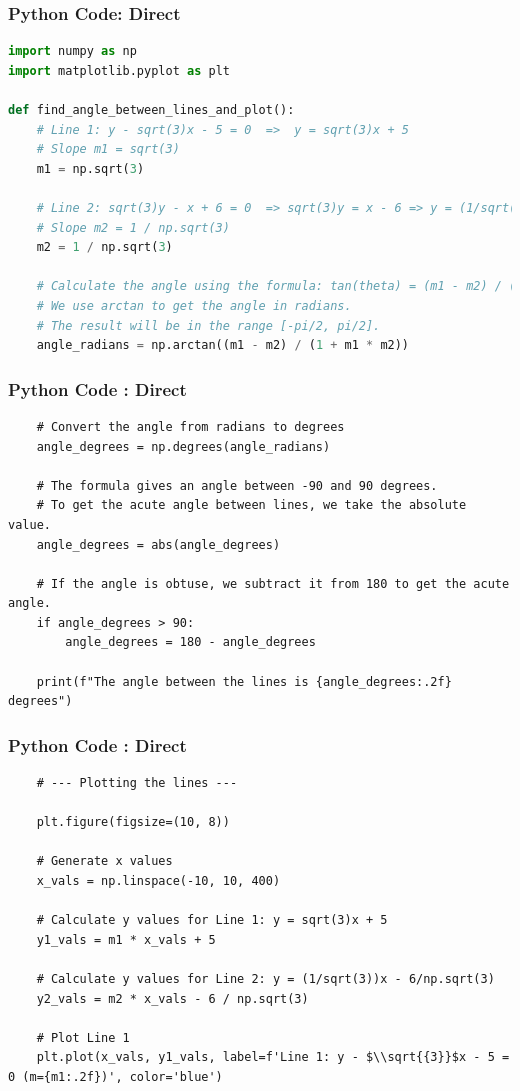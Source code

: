 \documentclass{beamer}
\begin{document}
\begin{frame}[fragile]
\frametitle{Python Code: Direct}
\begin{lstlisting}[language=Python]
import numpy as np
import matplotlib.pyplot as plt

def find_angle_between_lines_and_plot():
    # Line 1: y - sqrt(3)x - 5 = 0  =>  y = sqrt(3)x + 5
    # Slope m1 = sqrt(3)
    m1 = np.sqrt(3)

    # Line 2: sqrt(3)y - x + 6 = 0  => sqrt(3)y = x - 6 => y = (1/sqrt(3))x - 6/sqrt(3)
    # Slope m2 = 1 / np.sqrt(3)
    m2 = 1 / np.sqrt(3)

    # Calculate the angle using the formula: tan(theta) = (m1 - m2) / (1 + m1 * m2)
    # We use arctan to get the angle in radians.
    # The result will be in the range [-pi/2, pi/2].
    angle_radians = np.arctan((m1 - m2) / (1 + m1 * m2))
\end{lstlisting}

\end{frame}
\begin{frame}[fragile]
\frametitle{Python Code : Direct}

\begin{lstlisting}
    # Convert the angle from radians to degrees
    angle_degrees = np.degrees(angle_radians)

    # The formula gives an angle between -90 and 90 degrees.
    # To get the acute angle between lines, we take the absolute value.
    angle_degrees = abs(angle_degrees)

    # If the angle is obtuse, we subtract it from 180 to get the acute angle.
    if angle_degrees > 90:
        angle_degrees = 180 - angle_degrees

    print(f"The angle between the lines is {angle_degrees:.2f} degrees")
\end{lstlisting}

\end{frame}
\begin{frame}[fragile]
\frametitle{Python Code : Direct}

\begin{lstlisting}
    # --- Plotting the lines ---

    plt.figure(figsize=(10, 8))

    # Generate x values
    x_vals = np.linspace(-10, 10, 400)

    # Calculate y values for Line 1: y = sqrt(3)x + 5
    y1_vals = m1 * x_vals + 5

    # Calculate y values for Line 2: y = (1/sqrt(3))x - 6/np.sqrt(3)
    y2_vals = m2 * x_vals - 6 / np.sqrt(3)

    # Plot Line 1
    plt.plot(x_vals, y1_vals, label=f'Line 1: y - $\\sqrt{{3}}$x - 5 = 0 (m={m1:.2f})', color='blue')
\end{lstlisting}

\end{frame}
\end{document}
